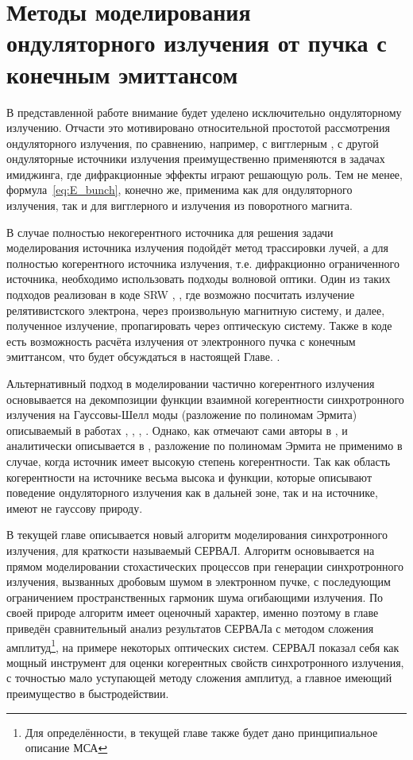 
\chapter{Методы моделирования ондуляторного излучения от пучка с конечным эмиттансом} \label{chapt2}
В представленной работе внимание будет уделено исключительно ондуляторному излучению. Отчасти это мотивировано относительной простотой рассмотрения ондуляторного излучения, по сравнению, например, с вигглерным \cite{geloni_brightness_2014}, с другой ондуляторные источники излучения преимущественно применяются в задачах имиджинга, где дифракционные эффекты играют решающую роль. Тем не менее, формула~\ref{eq:E_bunch}, конечно же, применима как для ондуляторного излучения, так и для вигглерного и излучения из поворотного магнита. 

В случае полностью некогерентного источника для решения задачи моделирования источника излучения подойдёт метод трассировки лучей, а для полностью когерентного источника излучения, т.е. дифракционно ограниченного источника, необходимо использовать подходы волновой оптики. Один из таких подходов реализован в коде SRW  \cite{chubar_accurate_1998}, \cite{chubar_simulation_2006}, где возможно посчитать излучение релятивистского электрона, через произвольную магнитную систему, и далее, полученное излучение, пропагировать через оптическую систему. Также в коде есть возможность расчёта излучения от электронного пучка с конечным эмиттансом, что будет обсуждаться в настоящей Главе. .

Альтернативный подход в моделировании частично когерентного излучения основывается на декомпозиции функции взаимной когерентности синхротронного излучения на Гауссовы-Шелл моды (разложение по полиномам Эрмита) описываемый в работах \cite{singer_modelling_2011}, \cite{hua_application_2012}, \cite{khubbutdinov_coherence_2019}, \cite{noauthor_iucr_nodate}. Однако, как отмечают сами авторы в \cite{khubbutdinov_coherence_2019}, \cite{noauthor_iucr_nodate} и аналитически описывается в \cite{geloni_transverse_2008}, разложение по полиномам Эрмита не применимо в случае, когда источник имеет высокую степень когерентности. Так как область когерентности на источнике весьма высока и функции, которые описывают поведение ондуляторного излучения как в дальней зоне, так и на источнике, имеют не гауссову природу.

В текущей главе описывается новый алгоритм моделирования синхротронного излучения, для краткости называемый СЕРВАЛ. Алгоритм основывается на прямом моделировании стохастических процессов при генерации синхротронного излучения, вызванных дробовым шумом в электронном пучке, с последующим ограничением пространственных гармоник шума огибающими излучения. По своей природе алгоритм имеет оценочный характер, именно поэтому в главе приведён сравнительный анализ результатов СЕРВАЛа с методом сложения амплитуд\footnote{Для определённости, в текущей главе также будет дано принципиальное описание МСА}, на примере некоторых оптических систем. СЕРВАЛ показал себя как мощный инструмент для оценки когерентных свойств синхротронного излучения, с точностью мало уступающей методу сложения амплитуд, а главное имеющий преимущество в быстродействии. 
